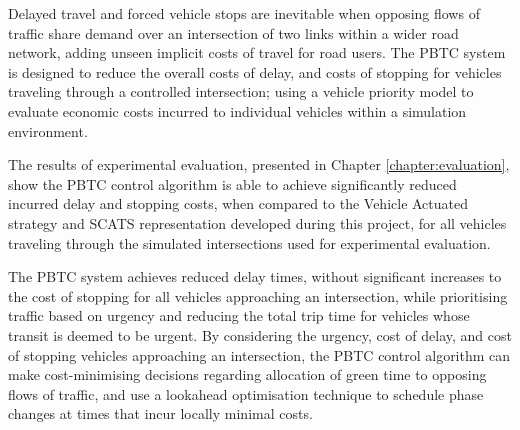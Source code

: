 Delayed travel and forced vehicle stops are inevitable when opposing flows of traffic share demand over an intersection of two links within a wider road network, adding unseen implicit costs of travel for road users. The PBTC system is designed to reduce the overall costs of delay, and costs of stopping for vehicles traveling through a controlled intersection; using a vehicle priority model to evaluate economic costs incurred to individual vehicles within a simulation environment.

The results of experimental evaluation, presented in Chapter \ref{chapter:evaluation}, show the PBTC control algorithm is able to achieve significantly reduced incurred delay and stopping costs, when compared to the Vehicle Actuated strategy and SCATS representation developed during this project, for all vehicles traveling through the simulated intersections used for experimental evaluation. 

The PBTC system achieves reduced delay times, without significant increases to the cost of stopping for all vehicles approaching an intersection, while prioritising traffic based on urgency and reducing the total trip time for vehicles whose transit is deemed to be urgent. By considering the urgency, cost of delay, and cost of stopping vehicles approaching an intersection, the PBTC control algorithm can make cost-minimising decisions regarding allocation of green time to opposing flows of traffic, and use a lookahead optimisation technique to schedule phase changes at times that incur locally minimal costs.








